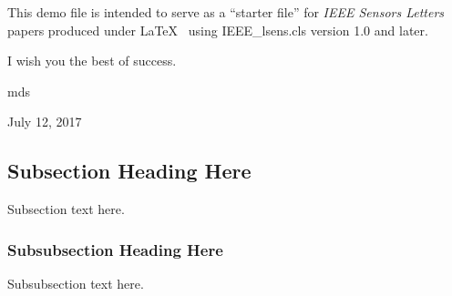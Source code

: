 \documentclass{IEEE_lsens}
\begin{document}
This demo file is intended to serve as a ``starter file''
for \textit{IEEE Sensors Letters} papers produced under \LaTeX\ 
\cite{IEEEhowto:kopka} using IEEE\_lsens.cls version 1.0 and later.

I wish you the best of success.

\hfill mds
 
\hfill July 12, 2017

\subsection{Subsection Heading Here}
Subsection text here.


\subsubsection{Subsubsection Heading Here}
Subsubsection text here.


%
%
%
%
\end{document}
